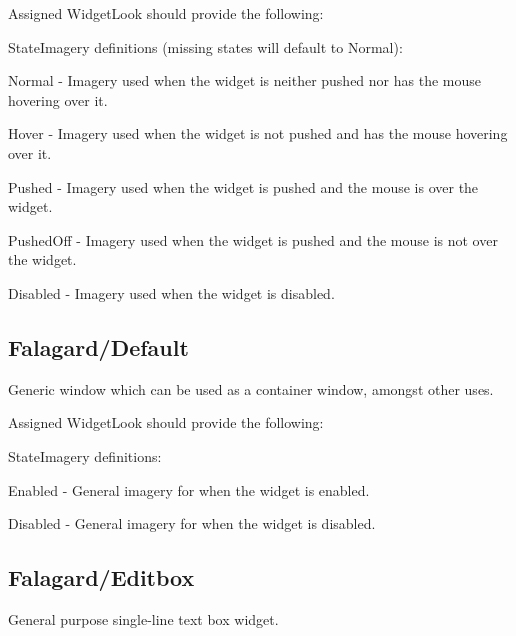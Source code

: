 Assigned Widget\+Look should provide the following\+: 
\begin{DoxyItemize}
\item State\+Imagery definitions (missing states will default to \textquotesingle{}Normal\textquotesingle{})\+: 
\begin{DoxyItemize}
\item Normal -\/ Imagery used when the widget is neither pushed nor has the mouse hovering over it. 
\item Hover -\/ Imagery used when the widget is not pushed and has the mouse hovering over it. 
\item Pushed -\/ Imagery used when the widget is pushed and the mouse is over the widget. 
\item Pushed\+Off -\/ Imagery used when the widget is pushed and the mouse is not over the widget. 
\item Disabled -\/ Imagery used when the widget is disabled. 
\end{DoxyItemize}
\end{DoxyItemize}\hypertarget{fal_wr_ref_fal_wr_ref_sec_2}{}\subsection{Falagard/\+Default}\label{fal_wr_ref_fal_wr_ref_sec_2}
Generic window which can be used as a container window, amongst other uses.

Assigned Widget\+Look should provide the following\+: 
\begin{DoxyItemize}
\item State\+Imagery definitions\+: 
\begin{DoxyItemize}
\item Enabled -\/ General imagery for when the widget is enabled. 
\item Disabled -\/ General imagery for when the widget is disabled. 
\end{DoxyItemize}
\end{DoxyItemize}\hypertarget{fal_wr_ref_fal_wr_ref_sec_3}{}\subsection{Falagard/\+Editbox}\label{fal_wr_ref_fal_wr_ref_sec_3}
General purpose single-\/line text box widget.

